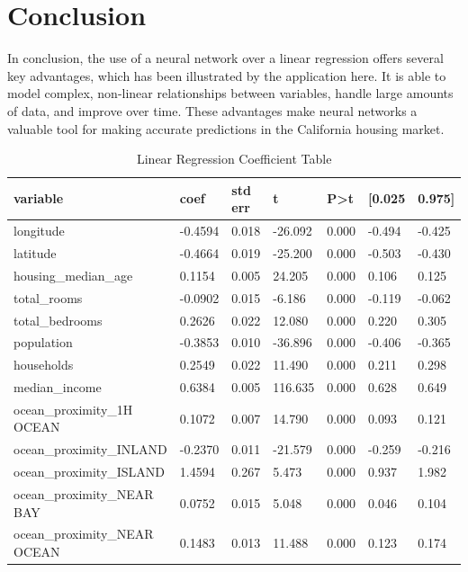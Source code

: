 \documentclass[11pt]{article}
\begin{document}
\section{Conclusion}
In conclusion, the use of a neural network over a linear regression offers several key advantages, which has been illustrated by the application here. It is able to model complex, non-linear relationships between variables, handle large amounts of data, and improve over time. These advantages make neural networks a valuable tool for making accurate predictions in the California housing market.

\nocite{Cetkovic2018, Geron2022, Pow2014}

\newpage

\appendix
\begin{table}[h]
        \begin{tabular}{|l|l|l|l|l|l|l|} 
        \hline
        \textbf{variable} & \textbf{coef} & \textbf{std err} & \textbf{t} & \textbf{P\textgreater{}\textbar{}t\textbar{}} & \textbf{[0.025} & \textbf{0.975]} \\ 
        \hline
        longitude & -0.4594 & 0.018 & -26.092 & 0.000 & -0.494 & -0.425 \\ 
        \hline
        latitude & -0.4664 & 0.019 & -25.200 & 0.000 & -0.503 & -0.430 \\ 
        \hline
        housing\_median\_age & 0.1154 & 0.005 & 24.205 & 0.000 & 0.106 & 0.125 \\ 
        \hline
        total\_rooms & -0.0902 & 0.015 & -6.186 & 0.000 & -0.119 & -0.062 \\ 
        \hline
        total\_bedrooms & 0.2626 & 0.022 & 12.080 & 0.000 & 0.220 & 0.305 \\ 
        \hline
        population & -0.3853 & 0.010 & -36.896 & 0.000 & -0.406 & -0.365 \\ 
        \hline
        households & 0.2549 & 0.022 & 11.490 & 0.000 & 0.211 & 0.298 \\ 
        \hline
        median\_income & 0.6384 & 0.005 & 116.635 & 0.000 & 0.628 & 0.649 \\ 
        \hline
        ocean\_proximity\_1H OCEAN & 0.1072 & 0.007 & 14.790 & 0.000 & 0.093 & 0.121 \\ 
        \hline
        ocean\_proximity\_INLAND & -0.2370 & 0.011 & -21.579 & 0.000 & -0.259 & -0.216 \\ 
        \hline
        ocean\_proximity\_ISLAND & 1.4594 & 0.267 & 5.473 & 0.000 & 0.937 & 1.982 \\ 
        \hline
        ocean\_proximity\_NEAR BAY & 0.0752 & 0.015 & 5.048 & 0.000 & 0.046 & 0.104 \\ 
        \hline
        ocean\_proximity\_NEAR OCEAN & 0.1483 & 0.013 & 11.488 & 0.000 & 0.123 & 0.174 \\
        \hline
        \end{tabular}
\caption{Linear Regression Coefficient Table}
\label{tab:lin-reg-table}
\end{table}


\end{document}
